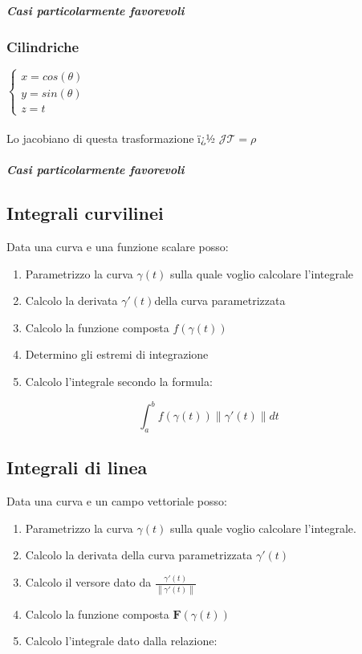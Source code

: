 \documentclass[10pt,a4paper]{report}
\newcommand{\norm}[1]{ \left\lVert {#1} \right\rVert}
\begin{document}
				\subparagraph{Casi particolarmente favorevoli}
				
				
			\subsubsection{Cilindriche}
			$ \begin{cases} 
			x=cos(\theta) \\ 
			y=sin(\theta) \\
			z=t
			\end{cases} $
			\\ \\
			Lo jacobiano di questa trasformazione ï¿½ $ \mathcal{J} \mathcal{T} =\rho $
			
				\subparagraph{Casi particolarmente favorevoli}
		

		\subsection*{Integrali \textbf{curvilinei}}
			Data una curva e una funzione scalare posso:
			\begin{enumerate}
				\item Parametrizzo la curva $ \gamma(t) $ sulla quale voglio calcolare l'integrale 
				\item Calcolo la derivata $ \gamma ' (t) $della curva parametrizzata 
				\item Calcolo la funzione composta $ f(\gamma (t)) $
				\item Determino gli estremi di integrazione
				\item Calcolo l'integrale secondo la formula:
			\end{enumerate}
		
		\[ \int_{a}^{b} f(\gamma (t)) \norm{\gamma '(t)} dt\]
		
		
		\subsection*{Integrali di \textbf{linea}}
		Data una curva e un campo vettoriale posso:
			\begin{enumerate}
				\item Parametrizzo la curva $ \gamma(t) $ sulla quale voglio calcolare l'integrale. 
				\item Calcolo la derivata della curva parametrizzata $ \gamma ' (t) $
				\item Calcolo il versore dato da $ \frac{\gamma '(t)}{\norm{\gamma '(t)}} $
				\item Calcolo la funzione composta $ \mathbf{F}(\gamma (t)) $
				\item Calcolo l'integrale dato dalla relazione:
				\end{enumerate}
			
\end{document}
